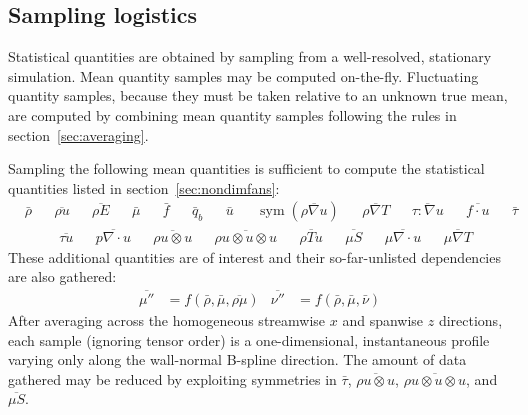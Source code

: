 \documentclass[letterpaper,11pt,nointlimits,reqno,draft]{amsart}
\newcommand{\symmetricpart}[1]
  {\ensuremath{\operatorname{sym}\left(#1\right)}}
\begin{document}
\subsection{Sampling logistics}

Statistical quantities are obtained by sampling from a well-resolved,
stationary simulation.  Mean quantity samples may be computed on-the-fly.
Fluctuating quantity samples, because they must be taken relative to an unknown
true mean, are computed by combining mean quantity samples following the rules
in section~\ref{sec:averaging}.

Sampling the following mean quantities is sufficient to compute
the statistical quantities listed in section~\ref{sec:nondimfans}:
\begin{align}
&\bar{\rho}
&
&\overline{\rho{}u}
&
&\overline{\rho{}E}
&
&\bar{\mu}
&
&\bar{f}
&
&\bar{q}_b
&
&\bar{u}
&
&\symmetricpart{\overline{\rho\nabla{}u}}
&
&\overline{\rho\nabla{}T}
&
&\overline{\tau:\nabla{}u}
&
&\overline{f\cdot{}u}
&
&\bar{\tau}
\end{align}
\begin{align}
&\overline{\tau{}u}
&
&\overline{p\nabla\cdot{}u}
&
&\overline{\rho{}u\otimes{}u}
&
&\overline{\rho{}u\otimes{}u\otimes{}u}
&
&\overline{\rho{}Tu}
&
&\overline{\mu{}S}
&
&\overline{\mu\nabla\cdot{}u}
&
&\overline{\mu\nabla{}T}
\end{align}
These additional quantities are of interest and their so-far-unlisted
dependencies are also gathered:
\begin{align}
  \overline{\mu{}''}&= f\left(
      \bar{\rho}, \bar{\mu}, \overline{\rho\mu}
  \right)
  &
  \overline{\nu{}''} &= f\left(
      \bar{\rho}, \bar{\mu}, \bar{\nu}
  \right)
\end{align}
After averaging across the homogeneous streamwise $x$ and spanwise $z$
directions, each sample (ignoring tensor order) is a one-dimensional,
instantaneous profile varying only along the wall-normal B-spline direction.
The amount of data gathered may be reduced by exploiting symmetries in
$\bar{\tau}$, $\overline{\rho{}u\otimes{}u}$,
$\overline{\rho{}u\otimes{}u\otimes{}u}$, and $\overline{\mu{}S}$.
\end{document}
